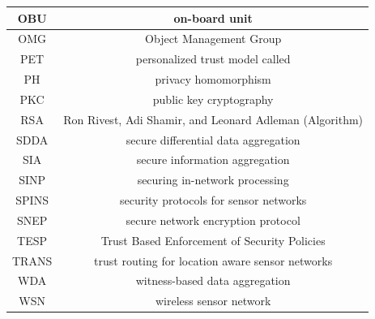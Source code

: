 \documentclass[12pt,a4paper,twoside]{report}
\begin{document}
\begin{table}[H]
\begin{center}
\begin{tabular}{|c|c|}
	        OBU & on-board unit \\ \hline
	        OMG & Object Management Group \\ \hline
	        PET & personalized trust model called\\ \hline
	        PH & privacy homomorphism \\ \hline
	        PKC & public key cryptography \\ \hline
	        RSA & Ron Rivest, Adi Shamir, and Leonard Adleman (Algorithm) \\ \hline
	        SDDA & secure differential data aggregation \\ \hline
	        SIA & secure information aggregation \\ \hline
	        SINP & securing in-network processing \\ \hline
	        SPINS & security protocols for sensor networks \\ \hline
	        SNEP & secure network encryption protocol \\ \hline
	        TESP & Trust Based Enforcement of Security Policies \\ \hline
	        TRANS & trust routing for location aware sensor networks \\ \hline
	        WDA & witness-based data aggregation \\ \hline
	        WSN & wireless sensor network \\ \hline
	  \end{tabular}
	  \end{center}
  \end{table}
\FloatBarrier

\fi
\end{document}
